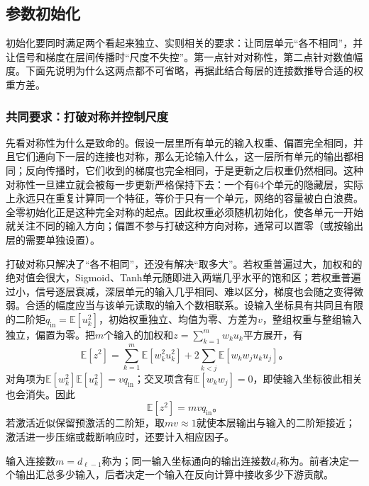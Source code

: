 \subsection{参数初始化}
\label{sec:ffn-initialization}

初始化要同时满足两个看起来独立、实则相关的要求：让同层单元“各不相同”，并让信号和梯度在层间传播时“尺度不失控”。第一点针对对称性，第二点针对数值幅度。下面先说明为什么这两点都不可省略，再据此结合每层的连接数推导合适的权重方差。

\subsubsection{共同要求：打破对称并控制尺度}
\label{sec:ffn-initialization-common}

先看对称性为什么是致命的。假设一层里所有单元的输入权重、偏置完全相同，并且它们通向下一层的连接也对称，那么无论输入什么，这一层所有单元的输出都相同；反向传播时，它们收到的梯度也完全相同，于是更新之后权重仍然相同。这种对称性一旦建立就会被每一步更新严格保持下去：一个有$64$个单元的隐藏层，实际上永远只在重复计算同一个特征，等价于只有一个单元，网络的容量被白白浪费。全零初始化正是这种完全对称的起点。因此权重必须随机初始化，使各单元一开始就关注不同的输入方向；偏置不参与打破这种方向对称，通常可以置零（或按输出层的需要单独设置）。

打破对称只解决了“各不相同”，还没有解决“取多大”。若权重普遍过大，加权和的绝对值会很大，Sigmoid、Tanh单元随即进入两端几乎水平的饱和区；若权重普遍过小，信号逐层衰减，深层单元的输入几乎相同、难以区分，梯度也会随之变得微弱。合适的幅度应当与该单元读取的输入个数相联系。设输入坐标具有共同且有限的二阶矩$q_{\mathrm{in}}=\mathbb E[u_k^2]$，初始权重独立、均值为零、方差为$v$，整组权重与整组输入独立，偏置为零。把$m$个输入的加权和$z=\sum_{k=1}^{m}w_k u_k$平方展开，有
\[
  \mathbb E[z^2]
  =\sum_{k=1}^{m}\mathbb E[w_k^2u_k^2]
    +2\sum_{k<j}\mathbb E[w_k w_j u_k u_j]\text{。}
\]
对角项为$\mathbb E[w_k^2]\mathbb E[u_k^2]=v q_{\mathrm{in}}$；交叉项含有$\mathbb E[w_k w_j]=0$，即使输入坐标彼此相关也会消失。因此
\begin{equation}
  \mathbb{E}[z^2]=m v q_{\mathrm{in}}\text{。}
  \label{eq:ffn-initial-signal-scale}
\end{equation}
若激活近似保留预激活的二阶矩，取$m v\approx1$就使本层输出与输入的二阶矩接近；激活进一步压缩或截断响应时，还要计入相应因子。

输入连接数$m=d_{\ell-1}$称为；同一输入坐标通向的输出连接数$d_\ell$称为。前者决定一个输出汇总多少输入，后者决定一个输入在反向计算中接收多少下游贡献。

